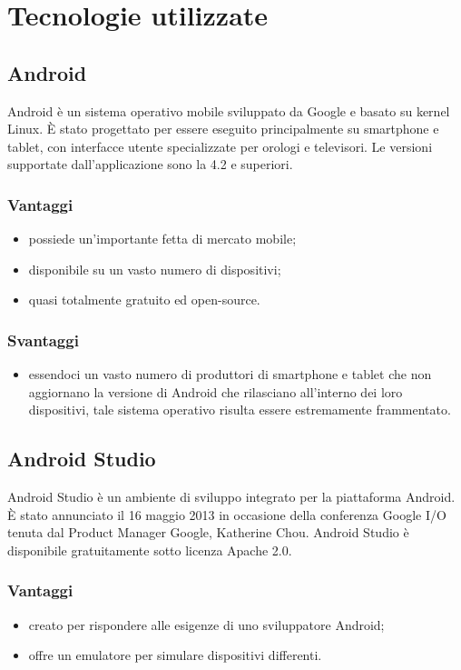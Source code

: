 \documentclass[../Tesi.tex]{subfiles}
\begin{document}
\section{Tecnologie utilizzate}\label{sec:tecnologieUtilizzate}	
	\subsection{Android}
		Android è un sistema operativo mobile sviluppato da Google e basato su kernel Linux. È stato progettato per essere eseguito principalmente su smartphone e tablet, con interfacce utente specializzate per orologi e televisori. Le versioni supportate dall'applicazione sono la 4.2 e superiori.
		\subsubsection{Vantaggi}
			\begin{itemize}
				\item possiede un'importante fetta di mercato mobile;
				\item disponibile su un vasto numero di dispositivi;
				\item quasi totalmente gratuito ed open-source.
			\end{itemize}
		\subsubsection{Svantaggi}
			\begin{itemize}
				\item essendoci un vasto numero di produttori di smartphone e tablet che non aggiornano la versione di Android che rilasciano all'interno dei loro dispositivi, tale sistema operativo risulta essere estremamente frammentato.
			\end{itemize}
	
	\subsection{Android Studio}
	Android Studio è un ambiente di sviluppo integrato per la piattaforma Android. È stato annunciato il 16 maggio 2013 in occasione della conferenza Google I/O tenuta dal Product Manager Google, Katherine Chou. Android Studio è disponibile gratuitamente sotto licenza Apache 2.0.
		\subsubsection{Vantaggi}
			\begin{itemize}
				\item creato per rispondere alle esigenze di uno sviluppatore Android;
				\item offre un emulatore per simulare dispositivi differenti.
			\end{itemize}
\end{document}
